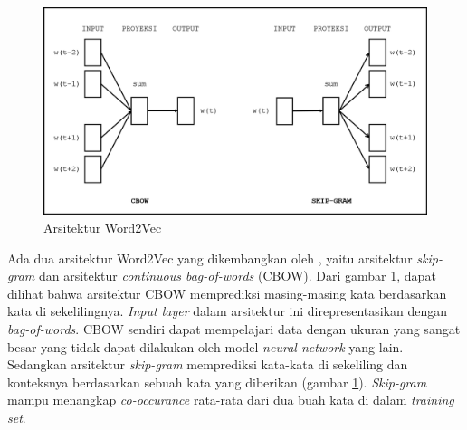 \begin{figure}
	\centering
	\includegraphics[width=0.85\linewidth]{images/word2vec}
	\caption{Arsitektur Word2Vec}
	\label{fig:word2vec}
\end{figure}

Ada dua arsitektur Word2Vec yang dikembangkan oleh \cite{mikolov2014word2vec}, yaitu arsitektur \textit{skip-gram} dan arsitektur \textit{continuous bag-of-words} (CBOW). Dari gambar \ref{fig:word2vec}, dapat dilihat bahwa arsitektur CBOW memprediksi masing-masing kata berdasarkan kata di sekelilingnya. \textit{Input layer} dalam arsitektur ini direpresentasikan dengan \textit{bag-of-words}. CBOW sendiri dapat mempelajari data dengan ukuran yang sangat besar yang tidak dapat dilakukan oleh model \textit{neural network} yang lain. Sedangkan arsitektur \textit{skip-gram} memprediksi kata-kata di sekeliling dan konteksnya berdasarkan sebuah kata yang diberikan (gambar \ref{fig:word2vec}). \textit{Skip-gram} mampu menangkap \textit{co-occurance} rata-rata dari dua buah kata di dalam \textit{training set}.
